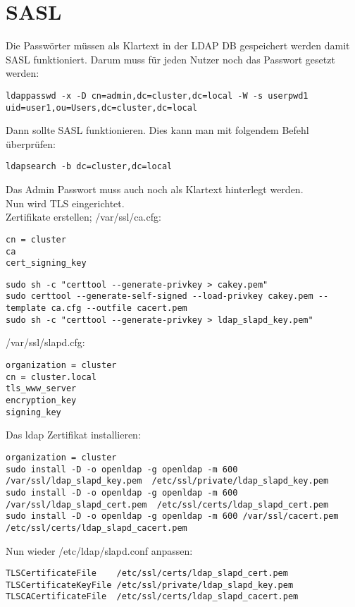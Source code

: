 \section{SASL}
Die Passwörter müssen als Klartext in der LDAP DB gespeichert werden damit SASL funktioniert. Darum muss für jeden Nutzer noch das Passwort gesetzt werden:
\begin{lstlisting}[style=Bash]
ldappasswd -x -D cn=admin,dc=cluster,dc=local -W -s userpwd1 uid=user1,ou=Users,dc=cluster,dc=local 
\end{lstlisting}
Dann sollte SASL funktionieren. Dies kann man mit folgendem Befehl überprüfen:
\begin{lstlisting}[style=Bash]
ldapsearch -b dc=cluster,dc=local
\end{lstlisting}
Das Admin Passwort muss auch noch als Klartext hinterlegt werden.\\
Nun wird TLS eingerichtet.\\
Zertifikate erstellen; /var/ssl/ca.cfg:
\begin{lstlisting}[style=Bash]
cn = cluster
ca
cert_signing_key
\end{lstlisting}
\begin{lstlisting}[style=Bash]
sudo sh -c "certtool --generate-privkey > cakey.pem" 
sudo certtool --generate-self-signed --load-privkey cakey.pem --template ca.cfg --outfile cacert.pem 
sudo sh -c "certtool --generate-privkey > ldap_slapd_key.pem"
\end{lstlisting}
/var/ssl/slapd.cfg:
\begin{lstlisting}[style=Bash]
organization = cluster
cn = cluster.local
tls_www_server
encryption_key
signing_key
\end{lstlisting}
Das ldap Zertifikat installieren:
\begin{lstlisting}[style=Bash]
organization = cluster
sudo install -D -o openldap -g openldap -m 600 /var/ssl/ldap_slapd_key.pem  /etc/ssl/private/ldap_slapd_key.pem
sudo install -D -o openldap -g openldap -m 600 /var/ssl/ldap_slapd_cert.pem  /etc/ssl/certs/ldap_slapd_cert.pem
sudo install -D -o openldap -g openldap -m 600 /var/ssl/cacert.pem  /etc/ssl/certs/ldap_slapd_cacert.pem 
\end{lstlisting}
Nun wieder /etc/ldap/slapd.conf anpassen:
\begin{lstlisting}[style=Bash]
TLSCertificateFile    /etc/ssl/certs/ldap_slapd_cert.pem
TLSCertificateKeyFile /etc/ssl/private/ldap_slapd_key.pem
TLSCACertificateFile  /etc/ssl/certs/ldap_slapd_cacert.pem
\end{lstlisting}
